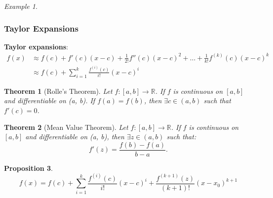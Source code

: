 \documentclass{amsproc}
\newtheorem{theorem}{Theorem}[section]
\newtheorem{proposition}[theorem]{Proposition}
\theoremstyle{definition}
\theoremstyle{remark}
\newtheorem*{example*}{Example}
\numberwithin{equation}{section}
\begin{document}
\begin{example*}
\end{example*}

\subsubsection{Taylor Expansions}

\textbf{Taylor expansions}:
\begin{align*}
    f(x) & \approx f(c) + f'(c)(x-c) + \frac{1}{2!}f''(c)(x-c)^{2} + \dots + \frac{1}{k!}f ^{(k)}(c)(x-c)^{k} \\
         & \approx f(c) + \sum_{i=1}^{k}\frac{f ^{(i)}(c)}{i!}(x-c)^{i}
\end{align*}

\begin{theorem}[Rolle's Theorem]
    Let $f: [a, b] \to \mathbb{R}$. If $f$ is continuous on $[a, b]$ and differentiable on (a, b). If $f(a)=f(b)$, then $\exists c \in (a,b)$ such that $f'(c) = 0$.
\end{theorem}

\begin{theorem}[Mean Value Theorem]
    Let $f: [a, b] \to \mathbb{R}$. If $f$ is continuous on $[a, b]$ and differentiable on (a, b), then $\exists z \in (a,b)$ such that:
    \begin{equation*}
        f'(z) = \frac{f(b)- f(a)}{b-a}.
    \end{equation*}
\end{theorem}

\begin{proposition}
    \begin{equation*}
        f(x) = f(c) + \sum_{i=1}^{k}\frac{f ^{(i)}(c)}{i!}(x-c)^{i} + \frac{f ^{(k+1)}(z)}{(k+1)!}(x-x_0)^{k+1}
    \end{equation*}
\end{proposition}
\end{document}
